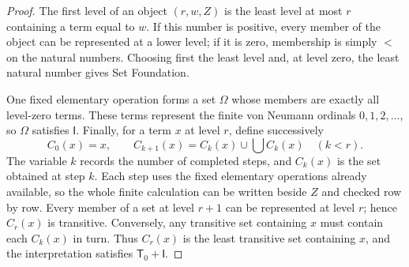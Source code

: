 \documentclass[11pt,a4paper]{article}
\newcommand{\Tzero}{\mathsf T_{0}}
\newcommand{\Inf}{\mathsf I}
\theoremstyle{plain}
\theoremstyle{definition}
\theoremstyle{remark}
\begin{document}
\begin{proof}
  The first level of an object \((r,w,Z)\) is the least level at most \(r\) containing a term equal to \(w\). If this number is positive, every member of the object can be represented at a lower level; if it is zero, membership is simply \(<\) on the natural numbers. Choosing first the least level and, at level zero, the least natural number gives Set Foundation.

  One fixed elementary operation forms a set \(\Omega\) whose members are exactly all level-zero terms. These terms represent the finite von Neumann ordinals \(0,1,2,\ldots\), so \(\Omega\) satisfies \(\Inf\). Finally, for a term \(x\) at level \(r\), define successively
  \[
    C_0(x)=x,
    \qquad C_{k+1}(x)=C_k(x)\cup\bigcup C_k(x)\quad(k<r).
  \]
  The variable \(k\) records the number of completed steps, and \(C_k(x)\) is the set obtained at step \(k\). Each step uses the fixed elementary operations already available, so the whole finite calculation can be written beside \(Z\) and checked row by row. Every member of a set at level \(r+1\) can be represented at level \(r\); hence \(C_r(x)\) is transitive. Conversely, any transitive set containing \(x\) must contain each \(C_k(x)\) in turn. Thus \(C_r(x)\) is the least transitive set containing \(x\), and the interpretation satisfies \(\Tzero+\Inf\).
\end{proof}
\end{document}
